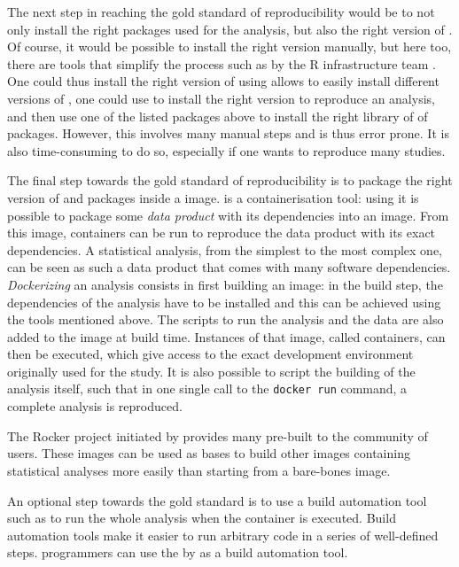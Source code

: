 \documentclass[
  article]{jss}
\begin{document}
The next step in reaching the gold standard of reproducibility would be
to not only install the right packages used for the analysis, but also
the right version of . Of course, it would be possible to
install the right version manually, but here too, there are tools that
simplify the process such as  by the R infrastructure team
\citeyearpar{rlib2023}. One could thus install the right version of
 using  allows to easily install different
versions of , one could use to install the right version to
reproduce an analysis, and then use one of the listed packages above to
install the right library of of  packages. However, this
involves many manual steps and is thus error prone. It is also
time-consuming to do so, especially if one wants to reproduce many
studies.

The final step towards the gold standard of reproducibility is to
package the right version of  and  packages
inside a  image.  is a
containerisation tool: using  it is possible to package
some \emph{data product} with its dependencies into an image. From this
image, containers can be run to reproduce the data product with its
exact dependencies. A statistical analysis, from the simplest to the
most complex one, can be seen as such a data product that comes with
many software dependencies. \emph{Dockerizing} an analysis consists in
first building an image: in the build step, the dependencies of the
analysis have to be installed and this can be achieved using the tools
mentioned above. The scripts to run the analysis and the data are also
added to the image at build time. Instances of that image, called
containers, can then be executed, which give access to the exact
development environment originally used for the study. It is also
possible to script the building of the analysis itself, such that in one
single call to the \texttt{docker\ run} command, a complete analysis is
reproduced.

The Rocker project initiated by \citet{boettiger2017} provides many
pre-built  to the  community of users.
These images can be used as bases to build other images containing
statistical analyses more easily than starting from a bare-bones image.

An optional step towards the gold standard is to use a build automation
tool such as  to run the whole analysis when the
container is executed. Build automation tools make it easier to run
arbitrary code in a series of well-defined steps. 
programmers can use the  by \citet{landau2021} as a build
automation tool.
\end{document}
